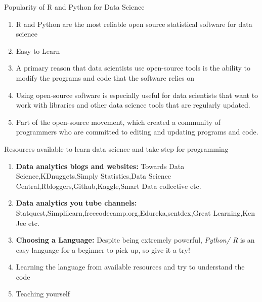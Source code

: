 \documentclass{beamer}
\begin{document}
	\begin{frame}[t]{Popularity of R and Python for Data Science}
		
		
		\begin{enumerate}
			\item R and Python are the most reliable open source statistical software for data science
			\item  Easy to Learn
			\item  A primary reason that data scientists use open-source tools is the ability to modify the programs and code that the software relies on
			\item Using open-source software is especially useful for data scientists that want to work with libraries and other data science tools that are regularly updated. 
			\item Part of the open-source movement, which created a community of programmers who are committed to editing and updating programs and code. 
		\end{enumerate}
	\end{frame}
	
	\begin{frame}[t]{Resources available to learn data science and take step for programming}
		
		
		\begin{enumerate}
			\item \textbf{Data analytics blogs and websites:} Towards Data 
			Science,KDnuggets,Simply Statistics,Data Science Central,Rbloggers,Github,Kaggle,Smart Data collective etc.
			\item \textbf {Data analytics you tube
			channels:} Statquest,Simplilearn,freecodecamp.org,Edureka,sentdex,Great 
			Learning,Ken Jee etc.
			\item \textbf{Choosing a Language:}
				 Despite being extremely powerful, \emph{Python/ R} is an easy language for a beginner to pick up, so give it a try! 
			
			\item Learning the language from available resources and try to understand the code
			\item Teaching yourself 
		\end{enumerate}
	\end{frame}
	
\end{document}
